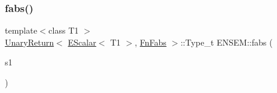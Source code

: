 \subsubsection{\texorpdfstring{fabs()}{fabs()}}
{\footnotesize\ttfamily template$<$class T1 $>$ \\
\mbox{\hyperlink{structENSEM_1_1UnaryReturn}{Unary\+Return}}$<$ \mbox{\hyperlink{classENSEM_1_1EScalar}{E\+Scalar}}$<$ T1 $>$, \mbox{\hyperlink{structENSEM_1_1FnFabs}{Fn\+Fabs}} $>$\+::Type\+\_\+t E\+N\+S\+E\+M\+::fabs (\begin{DoxyParamCaption}\item[{const \mbox{\hyperlink{classENSEM_1_1EScalar}{E\+Scalar}}$<$ T1 $>$ \&}]{s1 }\end{DoxyParamCaption})\hspace{0.3cm}{\ttfamily [inline]}}

